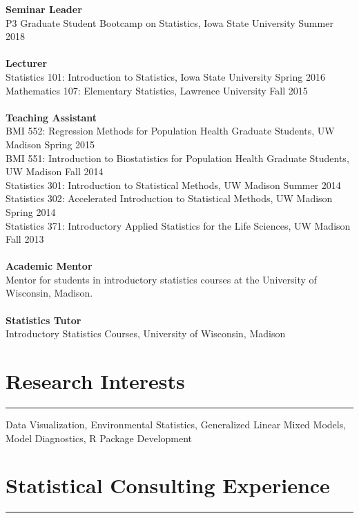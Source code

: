 \documentclass[11pt, oneside]{article}
\begin{document}
\textbf{Seminar Leader}\\
P3 Graduate Student Bootcamp on Statistics, Iowa State University \hfill{Summer 2018}\\
\\
\textbf{Lecturer}\\
Statistics 101: Introduction to Statistics, Iowa State University \hfill{Spring 2016}\\
Mathematics 107: Elementary Statistics, Lawrence University \hfill{Fall 2015}\\
\\
\textbf{Teaching Assistant}\\
BMI 552: Regression Methods for Population Health Graduate Students, UW Madison \hfill{Spring 2015}\\
BMI 551: Introduction to Biostatistics for Population Health Graduate Students, UW Madison \hfill{Fall 2014}\\
Statistics 301: Introduction to Statistical Methods, UW Madison \hfill{Summer 2014}\\
Statistics 302: Accelerated Introduction to Statistical Methods, UW Madison \hfill{Spring 2014}\\
Statistics 371: Introductory Applied Statistics for the Life Sciences, UW Madison \hfill{Fall 2013}\\
\\
\textbf{Academic Mentor}\\
Mentor for students in introductory statistics courses at the University of Wisconsin, Madison.\\
\\
\textbf{Statistics Tutor}\\
Introductory Statistics Courses, University of Wisconsin, Madison\\

\section*{Research Interests}
\hrule
\vspace{0.5cm}
Data Visualization, Environmental Statistics, Generalized Linear Mixed Models, Model Diagnostics, R Package Development\\

\section*{Statistical Consulting Experience}
\hrule
\vspace{0.5cm}
\end{document}
